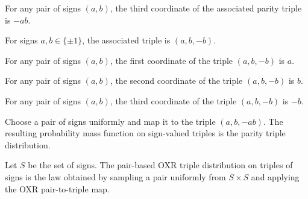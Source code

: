 \begin{theorem}
\label{FABL.oxrParityTriple_two}
\leanok
{}
For any pair of signs $(a,b)$, the third coordinate of the associated parity triple is
$-ab$.
\end{theorem}

\begin{definition}
\label{FABL.oxrPairTriple}
\leanok
{}
For signs $a,b\in\{\pm1\}$, the associated triple is $(a,b,-b)$.
\end{definition}

\begin{theorem}
\label{FABL.oxrPairTriple_zero}
\leanok
{}
For any pair of signs $(a,b)$, the first coordinate of the triple $(a,b,-b)$ is $a$.
\end{theorem}

\begin{theorem}
\label{FABL.oxrPairTriple_one}
\leanok
{}
For any pair of signs $(a,b)$, the second coordinate of the triple $(a,b,-b)$ is $b$.
\end{theorem}

\begin{theorem}
\label{FABL.oxrPairTriple_two}
\leanok
{}
For any pair of signs $(a,b)$, the third coordinate of the triple $(a,b,-b)$ is $-b$.
\end{theorem}

\begin{definition}
\label{FABL.oxrParityTriplePMF}
\leanok
{}
Choose a pair of signs uniformly and map it to the triple $(a,b,-ab)$. The resulting
probability mass function on sign-valued triples is the parity triple distribution.
\end{definition}

\begin{definition}
\label{FABL.oxrPairTriplePMF}
\leanok
{}
Let $S$ be the set of signs. The pair-based OXR triple distribution on triples of signs
is the law obtained by sampling a pair uniformly from $S\times S$ and applying the OXR
pair-to-triple map.
\end{definition}

